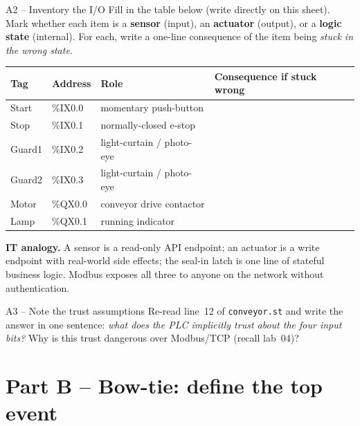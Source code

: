 \documentclass[11pt,a4paper]{article}
\begin{document}
\begin{stepbox}{A2 -- Inventory the I/O}
Fill in the table below (write directly on this sheet). Mark whether each item is a \textbf{sensor} (input), an \textbf{actuator} (output), or a \textbf{logic state} (internal). For each, write a one-line consequence of the item being \emph{stuck in the wrong state}.

\medskip
\renewcommand{\arraystretch}{1.25}
\begin{tabular}{|p{18mm}|p{20mm}|p{32mm}|p{75mm}|}
\hline
\textbf{Tag} & \textbf{Address} & \textbf{Role} & \textbf{Consequence if stuck wrong} \\
\hline
Start  & \%IX0.0 & momentary push-button & \\
\hline
Stop   & \%IX0.1 & normally-closed e-stop & \\
\hline
Guard1 & \%IX0.2 & light-curtain / photo-eye & \\
\hline
Guard2 & \%IX0.3 & light-curtain / photo-eye & \\
\hline
Motor  & \%QX0.0 & conveyor drive contactor & \\
\hline
Lamp   & \%QX0.1 & running indicator & \\
\hline
\end{tabular}

\medskip\noindent
\textbf{IT analogy.} A sensor is a read-only API endpoint; an actuator is a write endpoint with real-world side effects; the seal-in latch is one line of stateful business logic. Modbus exposes all three to anyone on the network without authentication.
\end{stepbox}

\begin{stepbox}{A3 -- Note the trust assumptions}
Re-read line~12 of \texttt{conveyor.st} and write the answer in one sentence: \emph{what does the PLC implicitly trust about the four input bits?} Why is this trust dangerous over Modbus/TCP (recall lab~04)?
\end{stepbox}

\section*{Part B -- Bow-tie: define the top event}
\end{document}
